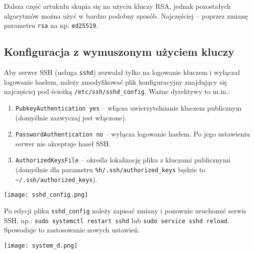 \documentclass{article}
\begin{document}
\begin{multicols}{2}
Dalsza część artukułu skupia się na użyciu kluczy RSA, jednak pozostałych algorytmów można użyć w bardzo podobny sposób. Najczęściej -- poprzez zmianę parametru \verb|rsa| na np. \verb|ed25519|.

\subsection{Konfiguracja z wymuszonym użyciem kluczy}
Aby serwer SSH (usługa \verb|sshd|) zezwalał tylko na logowanie kluczem i wyłączał logowanie hasłem, należy zmodyfikować plik konfiguracyjny znajdujący się najczęściej pod ścieżką \verb|/etc/ssh/sshd_config|\cite{sshconfig}. Ważne dyrektywy to m.in.:
\begin{enumerate}
    \item \verb|PubkeyAuthentication yes| -- włącza uwierzytelnianie kluczem publicznym (domyślnie zazwyczaj jest włączone).
    
    \item \verb|PasswordAuthentication no| -- wyłącza logowanie hasłem. Po jego ustawieniu serwer nie akceptuje haseł SSH.

    \item \verb|AuthorizedKeysFile| -- określa lokalizację pliku z kluczami publicznymi (domyślnie dla parametru \verb|%h/.ssh/authorized_keys| będzie to \verb|~/.ssh/authorized_keys|).
\end{enumerate}

\noindent
\texttt{[image: sshd\_config.png]}

Po edycji pliku \verb|sshd_config| należy zapisać zmiany i ponownie uruchomić serwis SSH, np.: \verb|sudo systemctl restart sshd| lub \verb|sudo service sshd reload|. Spowoduje to zastosowanie nowych ustawień. 

\noindent
\texttt{[image: system\_d.png]}

\end{multicols}
\end{document}
